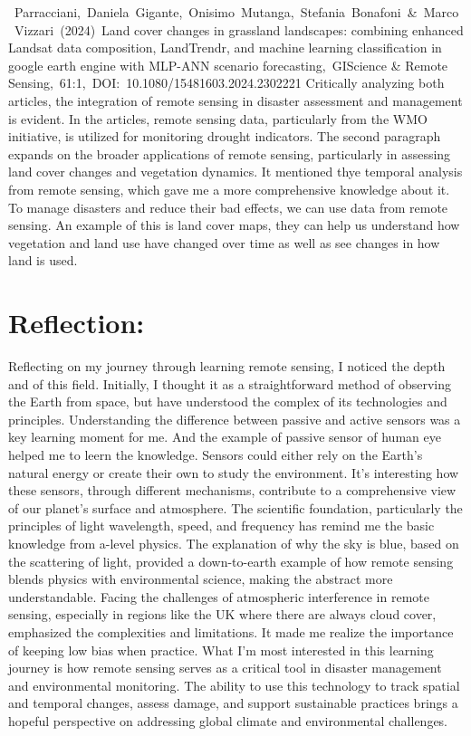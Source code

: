 \documentclass[
  letterpaper,
  DIV=11,
  numbers=noendperiod]{scrreprt}
\begin{document}
~Parracciani,~Daniela~Gigante,~Onisimo~Mutanga,~Stefania~Bonafoni~\&~Marco~Vizzari~(2024)~Land
cover changes in grassland landscapes: combining enhanced Landsat data
composition, LandTrendr, and machine learning classification in google
earth engine with MLP-ANN scenario forecasting,~GIScience \& Remote
Sensing,~61:1,~DOI:~10.1080/15481603.2024.2302221 Critically analyzing
both articles, the integration of remote sensing in disaster assessment
and management is evident. In the articles, remote sensing data,
particularly from the WMO initiative, is utilized for monitoring drought
indicators. The second paragraph expands on the broader applications of
remote sensing, particularly in assessing land cover changes and
vegetation dynamics. It mentioned thye temporal analysis from remote
sensing, which gave me a more comprehensive knowledge about it. To
manage disasters and reduce their bad effects, we can use data from
remote sensing. An example of this is land cover maps, they can help us
understand how vegetation and land use have changed over time as well as
see changes in how land is used.

\section{Reflection:}\label{reflection}

Reflecting on my journey through learning remote sensing, I noticed the
depth and of this field. Initially, I thought it as a straightforward
method of observing the Earth from space, but have understood the
complex of its technologies and principles. Understanding the difference
between passive and active sensors was a key learning moment for me. And
the example of passive sensor of human eye helped me to leern the
knowledge. Sensors could either rely on the Earth's natural energy or
create their own to study the environment. It's interesting how these
sensors, through different mechanisms, contribute to a comprehensive
view of our planet's surface and atmosphere. The scientific foundation,
particularly the principles of light wavelength, speed, and frequency
has remind me the basic knowledge from a-level physics. The explanation
of why the sky is blue, based on the scattering of light, provided a
down-to-earth example of how remote sensing blends physics with
environmental science, making the abstract more understandable. Facing
the challenges of atmospheric interference in remote sensing, especially
in regions like the UK where there are always cloud cover, emphasized
the complexities and limitations. It made me realize the importance of
keeping low bias when practice. What I'm most interested in this
learning journey is how remote sensing serves as a critical tool in
disaster management and environmental monitoring. The ability to use
this technology to track spatial and temporal changes, assess damage,
and support sustainable practices brings a hopeful perspective on
addressing global climate and environmental challenges.
\end{document}
